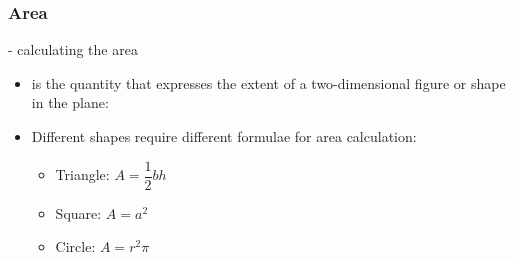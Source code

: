 \begin{module}[id=area]
\begin{frame}
  \frametitle{Area}
  - calculating the area\\
      \begin{itemize}
      \item
      \begin{definition}[id=area.def]
         is the quantity that expresses the extent of a two-dimensional figure or shape in the plane:
      \end{definition}
    \end{itemize}
\begin{itemize}
\item Different shapes require different formulae for area calculation:
  	\begin{itemize}
  	\item Triangle: $A = \dfrac{1}{2}bh$
  	\item Square: $A = a^2$
    \item Circle: $A = r^2\pi$
	\end{itemize}
\end{itemize}
\end{frame}
\end{module}
